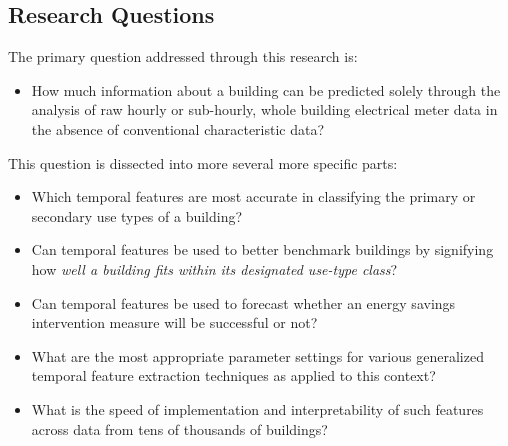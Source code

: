 \subsection{Research Questions}
The primary question addressed through this research is:
\begin{itemize}
\item How much information about a building can be predicted solely through the analysis of raw hourly or sub-hourly, whole building electrical meter data in the absence of conventional characteristic data? 
\end{itemize}
This question is dissected into more several more specific parts:
\begin{itemize}
\item Which temporal features are most accurate in classifying the primary or secondary use types of a building?
\item Can temporal features be used to better benchmark buildings by signifying how \emph{well a building fits within its designated use-type class}?
\item Can temporal features be used to forecast whether an energy savings intervention measure will be successful or not?
\item What are the most appropriate parameter settings for various generalized temporal feature extraction techniques as applied to this context?
\item What is the speed of implementation and interpretability of such features across data from tens of thousands of buildings?
\end{itemize}






